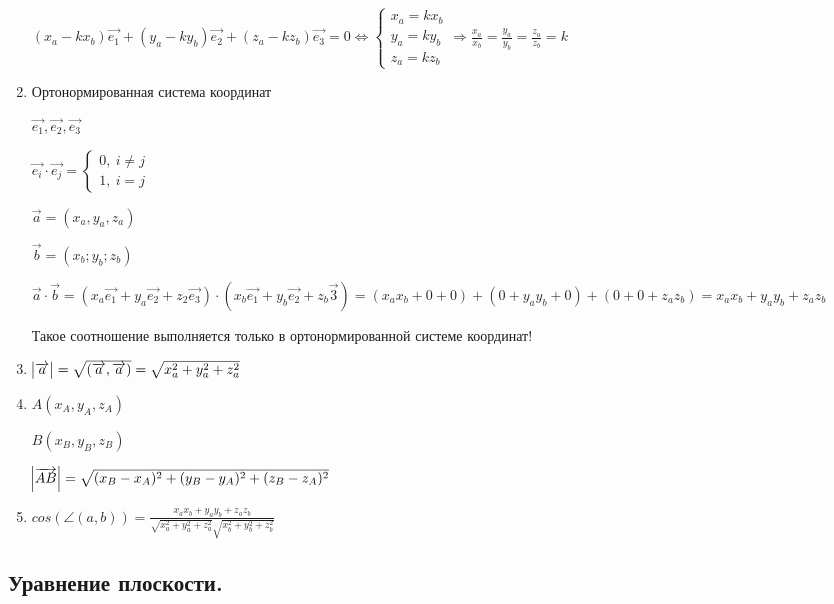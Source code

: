 \documentclass{article}
\begin{document}
\begin{enumerate}
        \( (x_a - kx_b)\overrightarrow{e_1} + (y_a - ky_b)\overrightarrow{e_2} + (z_a - kz_b)\overrightarrow{e_3} = 0 \Leftrightarrow \begin{cases}x_a = kx_b\\ y_a = ky_b\\ z_a = kz_b\end{cases} \Rightarrow \frac{x_a}{x_b} = \frac{y_a}{y_b} = \frac{z_a}{z_b} = k \)

        \item Ортонормированная система координат
        
        \( \overrightarrow{e_1}, \overrightarrow{e_2}, \overrightarrow{e_3} \)

        \( \overrightarrow{e_i} \cdot \overrightarrow{e_j} = \begin{cases} 0,\ i \neq j\\ 1,\ i = j\end{cases} \)

        \( \overrightarrow{a} = (x_a, y_a, z_a) \)

        \(\overrightarrow{b} = (x_b; y_b; z_b)\)

        \( \overrightarrow{a} \cdot \overrightarrow{b} = (x_a\overrightarrow{e_1}+y_a\overrightarrow{e_2} + z_2\overrightarrow{e_3})\cdot(x_b\overrightarrow{e_1} + y_b\overrightarrow{e_2} + z_b\overrightarrow{3}) = (x_ax_b + 0 + 0) + (0 + y_ay_b + 0) + (0 + 0 + z_az_b) = x_ax_b + y_ay_b + z_az_b\)

        Такое соотношение выполняется только в ортонормированной системе координат!
        

        \item

        \( \abs{\overrightarrow{a}} = \sqrt{(\overrightarrow{a}, \overrightarrow{a})} = \sqrt{x_a^2 + y_a^2 + z_a^2} \)

        \item 
        
        \( A(x_A, y_A, z_A) \)

        \( B(x_B, y_B, z_B) \)
        
        \( \abs{\overrightarrow{AB}} = \sqrt{(x_B-x_A)^2+(y_B-y_A)^2+(z_B-z_A)^2}\)
        
        \item \( cos(\angle(a, b)) = \frac{x_ax_b + y_ay_b + z_az_b}{\sqrt{x_a^2 + y_a^2 + z_a^2}\sqrt{x_b^2 + y_b^2 + z_b^2}} \)
    \end{enumerate}

    \subsection{Уравнение плоскости.}
\end{document}
